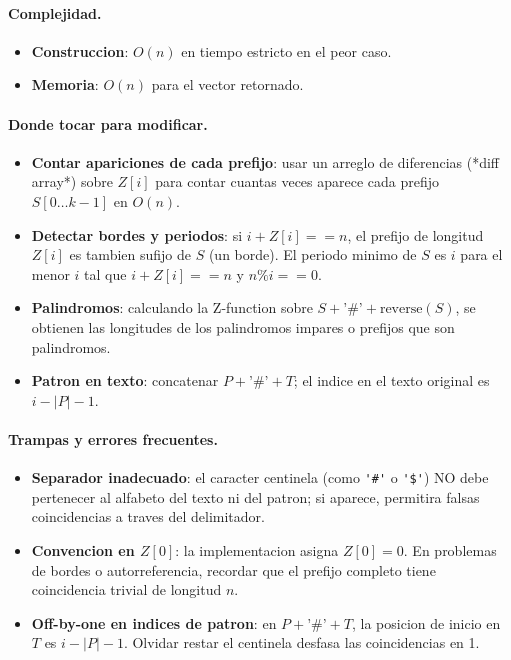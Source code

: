 \paragraph{Complejidad.}
\begin{itemize}\setlength\itemsep{0pt}
	\item \textbf{Construccion}: $O(n)$ en tiempo estricto en el peor caso.
	\item \textbf{Memoria}: $O(n)$ para el vector retornado.
\end{itemize}

\paragraph{Donde tocar para modificar.}
\begin{itemize}\setlength\itemsep{0pt}
	\item \textbf{Contar apariciones de cada prefijo}: usar un arreglo de diferencias (*diff array*) sobre $Z[i]$ para contar cuantas veces aparece cada prefijo $S[0 \dots k-1]$ en $O(n)$.
	\item \textbf{Detectar bordes y periodos}: si $i + Z[i] == n$, el prefijo de longitud $Z[i]$ es tambien sufijo de $S$ (un borde). El periodo minimo de $S$ es $i$ para el menor $i$ tal que $i + Z[i] == n$ y $n \% i == 0$.
	\item \textbf{Palindromos}: calculando la Z-function sobre $S + \text{'\#'} + \text{reverse}(S)$, se obtienen las longitudes de los palindromos impares o prefijos que son palindromos.
	\item \textbf{Patron en texto}: concatenar $P + \text{'\#'} + T$; el indice en el texto original es $i - |P| - 1$.
\end{itemize}

\paragraph{Trampas y errores frecuentes.}
\begin{itemize}\setlength\itemsep{0pt}
	\item \textbf{Separador inadecuado}: el caracter centinela (como \verb|'#'| o \verb|'$'|) NO debe pertenecer al alfabeto del texto ni del patron; si aparece, permitira falsas coincidencias a traves del delimitador.
	\item \textbf{Convencion en $Z[0]$}: la implementacion asigna $Z[0] = 0$. En problemas de bordes o autorreferencia, recordar que el prefijo completo tiene coincidencia trivial de longitud $n$.
	\item \textbf{Off-by-one en indices de patron}: en $P + \text{'\#'} + T$, la posicion de inicio en $T$ es $i - |P| - 1$. Olvidar restar el centinela desfasa las coincidencias en 1.
\end{itemize}

